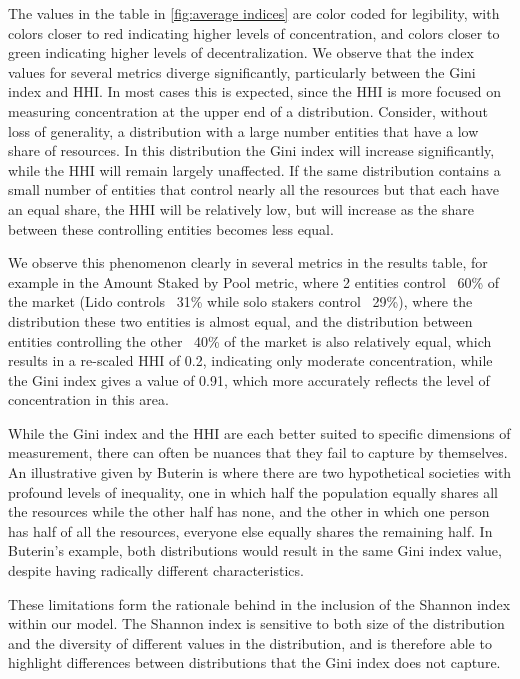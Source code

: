\documentclass[conference]{IEEEtran}
\begin{document}
The values in the table in \ref{fig:average indices} are color coded for legibility, with colors closer to red indicating higher levels of concentration, and colors closer to green indicating higher levels of decentralization. We observe that the index values for several metrics diverge significantly, particularly between the Gini index and HHI.  In most cases this is expected, since the HHI is more focused on measuring concentration at the upper end of a distribution. Consider, without loss of generality, a distribution with a large number entities that have a low share of resources. In this distribution the Gini index will increase significantly, while the HHI will remain largely unaffected.  If the same distribution contains a small number of entities that control nearly all the resources but that each have an equal share, the HHI will be relatively low, but will increase as the share between these controlling entities becomes less equal. 

We observe this phenomenon clearly in several metrics in the results table, for example in the Amount Staked by Pool metric, where 2 entities control ~60\% of the market\cite{hildobby2023} (Lido controls ~31\% while solo stakers control ~29\%), where the distribution these two entities is almost equal, and the distribution between entities controlling the other ~40\% of the market is also relatively equal, which results in a re-scaled HHI of 0.2, indicating only moderate concentration, while the Gini index gives a value of 0.91, which more accurately reflects the level of concentration in this area.

While the Gini index and the HHI are each better suited to specific dimensions of measurement, there can often be nuances that they fail to capture by themselves.  An illustrative given by Buterin \cite{buterin2022b} is where there are two hypothetical societies with profound levels of inequality, one in which half the population equally shares all the resources while the other half has none, and the other in which one person has half of all the resources, everyone else equally shares the remaining half.  In Buterin's example, both distributions would result in the same Gini index value, despite having radically different characteristics.

These limitations form the rationale behind in the inclusion of the Shannon index within our model.  The Shannon index is sensitive to both size of the distribution and the diversity of different values in the distribution, and is therefore able to highlight differences between distributions that the Gini index does not capture.
\end{document}
